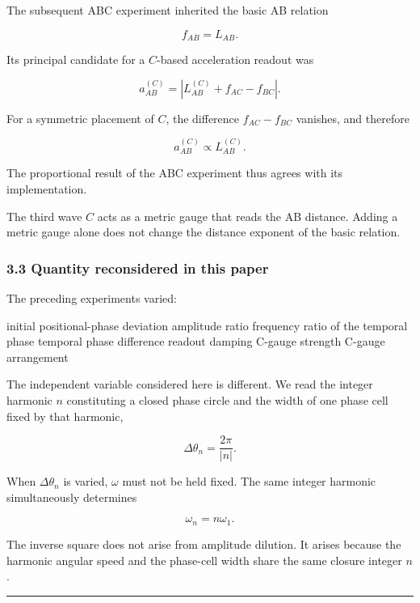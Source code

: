 \documentclass[
  a4paper,
]{article}
\newenvironment{Shaded}{}{}
\newcommand{\NormalTok}[1]{#1}
\begin{document}
The subsequent ABC experiment inherited the basic AB relation

\[
f_{AB}=L_{AB}.
\]

Its principal candidate for a \(C\)-based acceleration readout was

\[
a_{AB}^{(C)}
=\left|L_{AB}^{(C)}+f_{AC}-f_{BC}\right|.
\]

For a symmetric placement of \(C\), the difference \(f_{AC}-f_{BC}\)
vanishes, and therefore

\[
a_{AB}^{(C)}\propto L_{AB}^{(C)}.
\]

The proportional result of the ABC experiment thus agrees with its
implementation.

The third wave \(C\) acts as a metric gauge that reads the AB distance.
Adding a metric gauge alone does not change the distance exponent of the
basic relation.

\subsubsection{3.3 Quantity reconsidered in this
paper}\label{quantity-reconsidered-in-this-paper}

The preceding experiments varied:

\begin{Shaded}
\begin{Highlighting}[]
\NormalTok{initial positional{-}phase deviation}
\NormalTok{amplitude ratio}
\NormalTok{frequency ratio of the temporal phase}
\NormalTok{temporal phase difference}
\NormalTok{readout damping}
\NormalTok{C{-}gauge strength}
\NormalTok{C{-}gauge arrangement}
\end{Highlighting}
\end{Shaded}

The independent variable considered here is different. We read the
integer harmonic \(n\) constituting a closed phase circle and the width
of one phase cell fixed by that harmonic,

\[
\Delta\theta_n=\frac{2\pi}{|n|}.
\]

When \(\Delta\theta_n\) is varied, \(\omega\) must not be held fixed.
The same integer harmonic simultaneously determines

\[
\omega_n=n\omega_1.
\]

The inverse square does not arise from amplitude dilution. It arises
because the harmonic angular speed and the phase-cell width share the
same closure integer \(n\).

\begin{center}\rule{0.5\linewidth}{0.5pt}\end{center}
\end{document}
